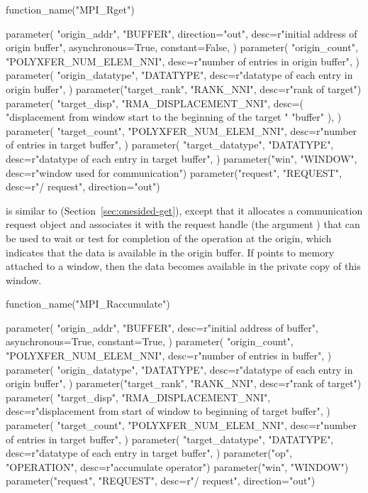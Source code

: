 %
%
\begin{mpi-binding}
    function_name("MPI_Rget")
    
    parameter(
        "origin_addr",
        "BUFFER",
        direction="out",
        desc=r"initial address of origin buffer",
        asynchronous=True,
        constant=False,
    )
    parameter(
        "origin_count",
        "POLYXFER_NUM_ELEM_NNI",
        desc=r"number of entries in origin buffer",
    )
    parameter(
        "origin_datatype",
        "DATATYPE",
        desc=r"datatype of each entry in origin buffer",
    )
    parameter("target_rank", "RANK_NNI", desc=r"rank of target")
    parameter(
        "target_disp",
        "RMA_DISPLACEMENT_NNI",
        desc=(
            "displacement from window start to the beginning of the target "
            "buffer"
        ),
    )
    parameter(
        "target_count",
        "POLYXFER_NUM_ELEM_NNI",
        desc=r"number of entries in target buffer",
    )
    parameter(
        "target_datatype",
        "DATATYPE",
        desc=r"datatype of each entry in target buffer",
    )
    parameter("win", "WINDOW", desc=r"window used for communication")
    parameter("request", "REQUEST", desc=r"\RMA/ request", direction="out")
\end{mpi-binding}

 is similar to 
(Section~\ref{sec:onesided-get}), except that it
allocates a communication request object and associates it with the
request handle (the argument ) that can be used to wait
or test for completion of the operation at the origin, which indicates that the
data is available in the origin buffer. If
 points to memory attached to a window, then the
data becomes available in the private copy of this window.

%
%
%
\begin{mpi-binding}
    function_name("MPI_Raccumulate")
    
    parameter(
        "origin_addr",
        "BUFFER",
        desc=r"initial address of buffer",
        asynchronous=True,
        constant=True,
    )
    parameter(
        "origin_count",
        "POLYXFER_NUM_ELEM_NNI",
        desc=r"number of entries in buffer",
    )
    parameter(
        "origin_datatype",
        "DATATYPE",
        desc=r"datatype of each entry in origin buffer",
    )
    parameter("target_rank", "RANK_NNI", desc=r"rank of target")
    parameter(
        "target_disp",
        "RMA_DISPLACEMENT_NNI",
        desc=r"displacement from start of window to beginning of target buffer",
    )
    parameter(
        "target_count",
        "POLYXFER_NUM_ELEM_NNI",
        desc=r"number of entries in target buffer",
    )
    parameter(
        "target_datatype",
        "DATATYPE",
        desc=r"datatype of each entry in target buffer",
    )
    parameter("op", "OPERATION", desc=r"accumulate operator")
    parameter("win", "WINDOW")
    parameter("request", "REQUEST", desc=r"\RMA/ request", direction="out")
\end{mpi-binding}

